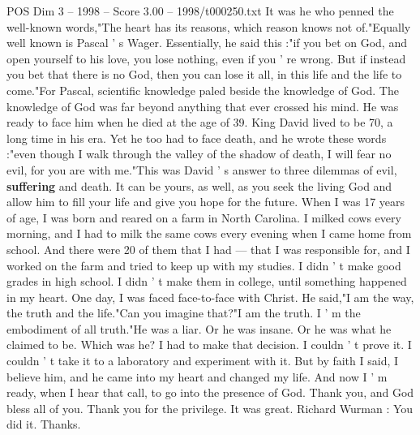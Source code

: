 \begin{textsample}{POS Dim 3 – 1998 – Score 3.00 – 1998/t000250.txt}
It was he who penned the well-known words,"The heart has its reasons, which reason knows not of."Equally well known is Pascal ' s Wager.
Essentially, he said this :"if you bet on God, and open yourself to his love, you lose nothing, even if you ' re wrong.
But if instead you bet that there is no God, then you can lose it all, in this life and the life to come."For Pascal, scientific knowledge paled beside the knowledge of God.
The knowledge of God was far beyond anything that ever crossed his mind.
He was ready to face him when he died at the age of 39.
King David lived to be 70, a long time in his era.
Yet he too had to face death, and he wrote these words :"even though I walk through the valley of the shadow of death, I will fear no evil, for you are with me."This was David ' s answer to three dilemmas of evil, \textbf{suffering} and death.
It can be yours, as well, as you seek the living God and allow him to fill your life and give you hope for the future.
When I was 17 years of age, I was born and reared on a farm in North Carolina.
I milked cows every morning, and I had to milk the same cows every evening when I came home from school.
And there were 20 of them that I had — that I was responsible for, and I worked on the farm and tried to keep up with my studies.
I didn ' t make good grades in high school.
I didn ' t make them in college, until something happened in my heart.
One day, I was faced face-to-face with Christ.
He said,"I am the way, the truth and the life."Can you imagine that?"I am the truth.
I ' m the embodiment of all truth."He was a liar.
Or he was insane.
Or he was what he claimed to be.
Which was he?
I had to make that decision.
I couldn ' t prove it.
I couldn ' t take it to a laboratory and experiment with it.
But by faith I said, I believe him, and he came into my heart and changed my life.
And now I ' m ready, when I hear that call, to go into the presence of God.
Thank you, and God bless all of you.
Thank you for the privilege.
It was great.
Richard Wurman : You did it.
Thanks.

\end{textsample}
